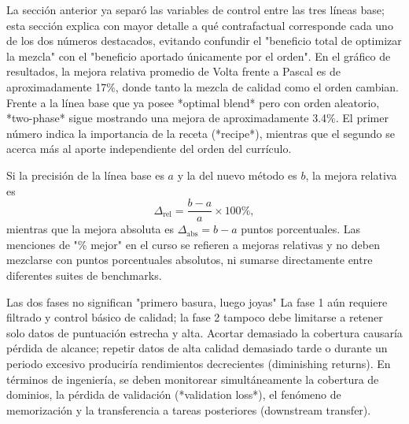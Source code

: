 La sección anterior ya separó las variables de control entre las tres líneas base; esta sección explica con mayor detalle a qué contrafactual corresponde cada uno de los dos números destacados, evitando confundir el "beneficio total de optimizar la mezcla" con el "beneficio aportado únicamente por el orden". En el gráfico de resultados, la mejora relativa promedio de Volta frente a Pascal es de aproximadamente 17\%, donde tanto la mezcla de calidad como el orden cambian. Frente a la línea base que ya posee *optimal blend* pero con orden aleatorio, *two-phase* sigue mostrando una mejora de aproximadamente 3.4\%. El primer número indica la importancia de la receta (*recipe*), mientras que el segundo se acerca más al aporte independiente del orden del currículo.


Si la precisión de la línea base es $a$ y la del nuevo método es $b$, la mejora relativa es
\[
\Delta_{\mathrm{rel}}=\frac{b-a}{a}\times 100\%,
\]
mientras que la mejora absoluta es $\Delta_{\mathrm{abs}}=b-a$ puntos porcentuales. Las menciones de "\% mejor" en el curso se refieren a mejoras relativas y no deben mezclarse con puntos porcentuales absolutos, ni sumarse directamente entre diferentes suites de benchmarks.


\begin{warningbox}{Las dos fases no significan "primero basura, luego joyas"}
La fase 1 aún requiere filtrado y control básico de calidad; la fase 2 tampoco debe limitarse a retener solo datos de puntuación estrecha y alta. Acortar demasiado la cobertura causaría pérdida de alcance; repetir datos de alta calidad demasiado tarde o durante un periodo excesivo produciría rendimientos decrecientes (diminishing returns). En términos de ingeniería, se deben monitorear simultáneamente la cobertura de dominios, la pérdida de validación (*validation loss*), el fenómeno de memorización y la transferencia a tareas posteriores (downstream transfer).
\end{warningbox}

